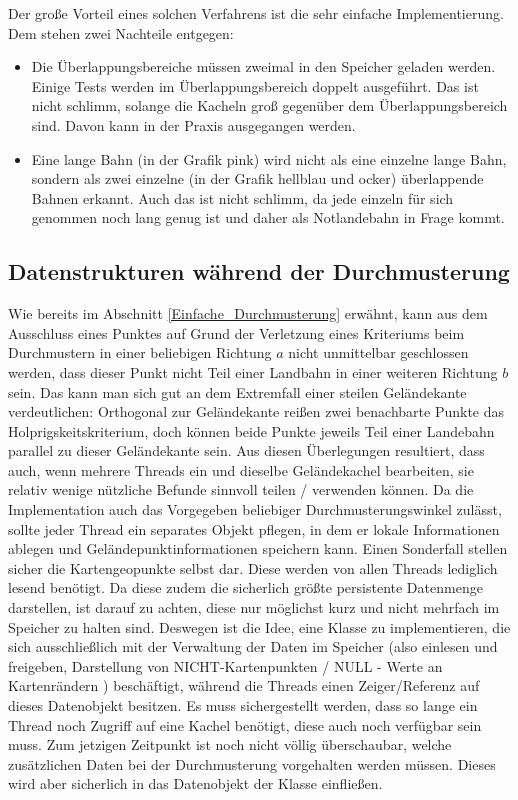 \documentclass[
11pt, %
a4paper, %
oneside, %
pdfspacing, %
headinclude,
BCOR5mm, %
ngerman, %
bibtotocnumbered,
]{scrartcl}
\begin{document}
Der große Vorteil eines solchen Verfahrens ist die sehr einfache Implementierung. Dem stehen zwei Nachteile entgegen:
\begin{itemize}
	\item Die Überlappungsbereiche müssen zweimal in den Speicher geladen werden. Einige Tests werden im Überlappungsbereich doppelt ausgeführt. Das ist nicht schlimm, solange die Kacheln groß gegenüber dem Überlappungsbereich sind. Davon kann in der Praxis ausgegangen werden.
	\item Eine lange Bahn (in der Grafik pink) wird nicht als eine einzelne lange Bahn, sondern als zwei einzelne (in der Grafik hellblau und ocker) überlappende Bahnen erkannt. Auch das ist nicht schlimm, da jede einzeln für sich genommen noch lang genug ist und daher als Notlandebahn in Frage kommt.
\end{itemize}


\subsection{Datenstrukturen während der Durchmusterung}

Wie bereits im Abschnitt \ref{Einfache_Durchmusterung} erwähnt, kann aus dem Ausschluss eines Punktes auf Grund der Verletzung eines Kriteriums beim Durchmustern in einer beliebigen Richtung $a$ nicht unmittelbar geschlossen werden, dass dieser Punkt nicht Teil einer Landbahn in einer weiteren Richtung $b$ sein. Das kann man sich gut an dem Extremfall einer steilen Geländekante verdeutlichen: Orthogonal zur Geländekante reißen zwei benachbarte Punkte das Holprigskeitskriterium, doch können beide Punkte jeweils Teil einer Landebahn parallel zu dieser Geländekante sein.
Aus diesen Überlegungen resultiert, dass auch, wenn mehrere Threads ein und dieselbe Geländekachel bearbeiten, sie relativ wenige nützliche Befunde sinnvoll teilen / verwenden können. Da die Implementation auch das Vorgegeben beliebiger Durchmusterungswinkel zulässt, sollte jeder Thread ein separates Objekt pflegen, in dem er lokale Informationen ablegen und Geländepunktinformationen speichern kann. 
Einen Sonderfall stellen sicher die Kartengeopunkte selbst dar. Diese werden von allen Threads lediglich lesend benötigt. Da diese zudem die sicherlich größte persistente Datenmenge darstellen, ist darauf zu achten, diese nur möglichst kurz und nicht mehrfach im Speicher zu halten sind. Deswegen ist die Idee, eine Klasse zu implementieren, die sich ausschließlich mit der Verwaltung der Daten im Speicher (also einlesen und freigeben, Darstellung von NICHT-Kartenpunkten / NULL - Werte an Kartenrändern ) beschäftigt, während die Threads einen Zeiger/Referenz auf dieses Datenobjekt besitzen. Es muss sichergestellt werden, dass so lange ein Thread noch Zugriff auf eine Kachel benötigt, diese auch noch verfügbar sein muss. Zum jetzigen Zeitpunkt ist noch nicht völlig überschaubar, welche zusätzlichen Daten bei der Durchmusterung vorgehalten werden müssen. Dieses wird aber sicherlich in das Datenobjekt der Klasse einfließen.
\end{document}
